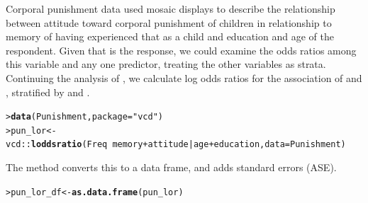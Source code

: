 \documentclass[10pt,krantz2]{krantz}\usepackage[]{graphicx}\usepackage[]{color}
\makeatletter
\newcommand{\hlstr}[1]{\textcolor[rgb]{0.192,0.494,0.8}{#1}}%
\newcommand{\hlopt}[1]{\textcolor[rgb]{0,0,0}{#1}}%
\newcommand{\hlstd}[1]{\textcolor[rgb]{0.345,0.345,0.345}{#1}}%
\newcommand{\hlkwb}[1]{\textcolor[rgb]{0.69,0.353,0.396}{#1}}%
\newcommand{\hlkwc}[1]{\textcolor[rgb]{0.333,0.667,0.333}{#1}}%
\newcommand{\hlkwd}[1]{\textcolor[rgb]{0.737,0.353,0.396}{\textbf{#1}}}%
\newenvironment{kframe}{%
 \def\at@end@of@kframe{}%
 \ifinner\ifhmode%
  \def\at@end@of@kframe{\end{minipage}}%
  \begin{minipage}{\columnwidth}%
 \fi\fi%
 \def\FrameCommand##1{\hskip\@totalleftmargin \hskip-\fboxsep
 \colorbox{shadecolor}{##1}\hskip-\fboxsep
     \hskip-\linewidth \hskip-\@totalleftmargin \hskip\columnwidth}%
 \MakeFramed {\advance\hsize-\width
   \@totalleftmargin\z@ \linewidth\hsize
   \@setminipage}}%
 {\par\unskip\endMakeFramed%
 \at@end@of@kframe}
\newenvironment{knitrout}{}{} %
\renewenvironment{knitrout}{\small\renewcommand{\baselinestretch}{.85}}{} %
\makeatother
\begin{document}
\begin{Example}[punish2]{Corporal punishment data}
 used mosaic displays to describe the relationship between attitude toward corporal punishment of children
in relationship to memory of having experienced that as a child and education and age of the respondent.
Given that  is the response, we could examine the odds ratios among this variable and any one predictor,
treating the other variables as strata.
Continuing the analysis of , we calculate log odds ratios for
the association of  and , stratified by  and .
\begin{knitrout}
\color{fgcolor}\begin{kframe}
\begin{alltt}
\hlstd{> }\hlkwd{data}\hlstd{(Punishment,} \hlkwc{package}\hlstd{=}\hlstr{"vcd"}\hlstd{)}
\hlstd{> }\hlstd{pun_lor} \hlkwb{<-} \hlstd{vcd}\hlopt{::}\hlkwd{loddsratio}\hlstd{(Freq} \hlopt{~} \hlstd{memory} \hlopt{+} \hlstd{attitude} \hlopt{|} \hlstd{age} \hlopt{+} \hlstd{education,} \hlkwc{data} \hlstd{= Punishment)}
\end{alltt}
\end{kframe}
\end{knitrout}
The  method converts this to a data frame, and adds standard errors (ASE).
\begin{knitrout}
\color{fgcolor}\begin{kframe}
\begin{alltt}
\hlstd{> }\hlstd{pun_lor_df} \hlkwb{<-} \hlkwd{as.data.frame}\hlstd{(pun_lor)}
\end{alltt}
\end{kframe}
\end{knitrout}



\end{Example}
\end{document}
